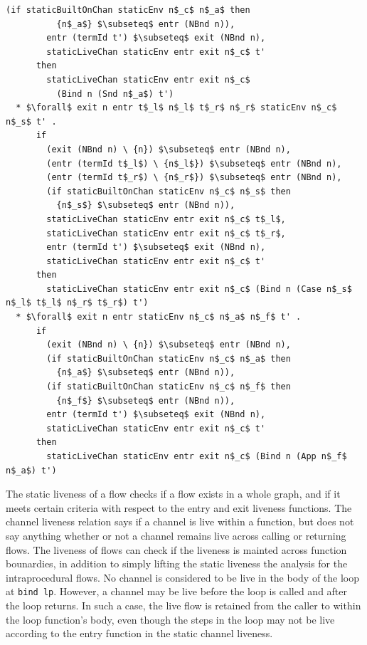 \documentclass[letterpaper, 11pt]{extarticle}
\begin{document}
\begin{lstlisting}[language=logic, mathescape]
        (if staticBuiltOnChan staticEnv n$_c$ n$_a$ then
          {n$_a$} $\subseteq$ entr (NBnd n)),
        entr (termId t') $\subseteq$ exit (NBnd n),
        staticLiveChan staticEnv entr exit n$_c$ t'
      then
        staticLiveChan staticEnv entr exit n$_c$
          (Bind n (Snd n$_a$) t')
  * $\forall$ exit n entr t$_l$ n$_l$ t$_r$ n$_r$ staticEnv n$_c$ n$_s$ t' .
      if 
        (exit (NBnd n) \ {n}) $\subseteq$ entr (NBnd n),
        (entr (termId t$_l$) \ {n$_l$}) $\subseteq$ entr (NBnd n),
        (entr (termId t$_r$) \ {n$_r$}) $\subseteq$ entr (NBnd n),
        (if staticBuiltOnChan staticEnv n$_c$ n$_s$ then
          {n$_s$} $\subseteq$ entr (NBnd n)),
        staticLiveChan staticEnv entr exit n$_c$ t$_l$,
        staticLiveChan staticEnv entr exit n$_c$ t$_r$,
        entr (termId t') $\subseteq$ exit (NBnd n),
        staticLiveChan staticEnv entr exit n$_c$ t'
      then 
        staticLiveChan staticEnv entr exit n$_c$ (Bind n (Case n$_s$ n$_l$ t$_l$ n$_r$ t$_r$) t')
  * $\forall$ exit n entr staticEnv n$_c$ n$_a$ n$_f$ t' .
      if
        (exit (NBnd n) \ {n}) $\subseteq$ entr (NBnd n),
        (if staticBuiltOnChan staticEnv n$_c$ n$_a$ then
          {n$_a$} $\subseteq$ entr (NBnd n)),
        (if staticBuiltOnChan staticEnv n$_c$ n$_f$ then
          {n$_f$} $\subseteq$ entr (NBnd n)),
        entr (termId t') $\subseteq$ exit (NBnd n),
        staticLiveChan staticEnv entr exit n$_c$ t'
      then
        staticLiveChan staticEnv entr exit n$_c$ (Bind n (App n$_f$ n$_a$) t')
\end{lstlisting}

The static liveness of a flow checks if a flow exists in a whole graph,
and if it meets certain criteria with respect to the entry and exit liveness
functions.  The channel liveness relation says if a channel is live within a function, but
does not say anything whether or not a channel remains live across calling or returning flows.
The liveness of flows can check if the liveness is mainted across function bounardies, in addition
to simply lifting the static liveness the analysis for the intraprocedural flows.
No channel is considered to be live in the body of the loop at \lstinline[language=normal_lang]{bind lp}.
However, a channel may be live before the loop is
called and after the loop returns. In such a case, the live flow is retained
from the caller to within the loop function's body, even though the steps in
the loop may not be live according to the entry function in the static channel liveness.
\end{document}
